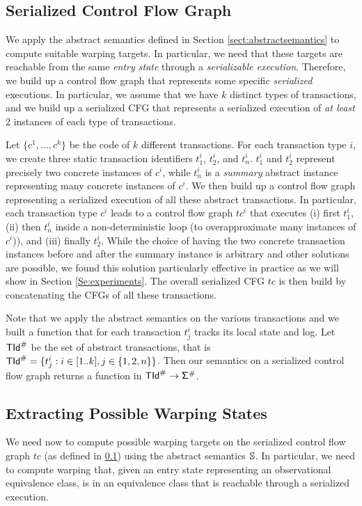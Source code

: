 \subsection{Serialized Control Flow Graph}
\label{Se:concabs}
We apply the abstract semantics defined in Section \ref{sect:abstractsemantics} to compute suitable warping targets. In particular, we need that these targets are reachable from the same \emph{entry state} through a \emph{serializable execution}. Therefore, we build up a control flow graph that represents some specific \emph{serialized} executions. In particular, we assume that we have $k$ distinct types of transactions, and we build up a serialized CFG that represents a serialized execution of \emph{at least} 2 instances of each type of transactions.

Let $\{c^1, ..., c^k\}$ be the code of $k$ different transactions. For each transaction type $i$, we create three static transaction identifiers $t^i_1$, $t^i_2$, and $t^i_n$. $t^i_1$ and $t^i_2$ represent precisely two concrete instances of $c^i$, while $t^i_n$ is a \emph{summary} abstract instance representing many concrete instances of $c^i$. We then build up a control flow graph representing a serialized execution of all these abstract transactions. In particular, each transaction type $c^i$ leads to a control flow graph $tc^i$ that executes (i) first $t^i_1$, (ii) then $t^i_n$ inside a non-deterministic loop (to overapproximate many instances of $c^i$)), and (iii) finally $t^i_2$. While the choice of having the two concrete transaction instances before and after the summary instance is arbitrary and other solutions are possible, we found this solution particularly effective in practice as we will show in Section \ref{Se:experiments}. The overall serialized CFG $tc$ is then build by concatenating the CFGs of all these transactions.

Note that we apply the abstract semantics on the various transactions and we built a function that for each transaction $t^i_j$ tracks its local state and log. Let $\mathsf{TId}^\#$ be the set of abstract transactions, that is $\mathsf{TId}^\# = \{t^i_j : i \in [1..k], j \in \{1, 2, n\}\}$. Then our semantics on a serialized control flow graph returns a function in $\mathsf{TId}^\# \to \mathsf{\Sigma}^\#$.

\subsection{Extracting Possible Warping States}
We need now to compute possible warping targets on the serialized control flow graph $tc$ (as defined in \ref{Se:concabs}) using the abstract semantics $\mathbb{S}$. In particular, we need to compute warping that, given an entry state representing an observational equivalence class, is in an equivalence class that is reachable through a serialized execution. 

